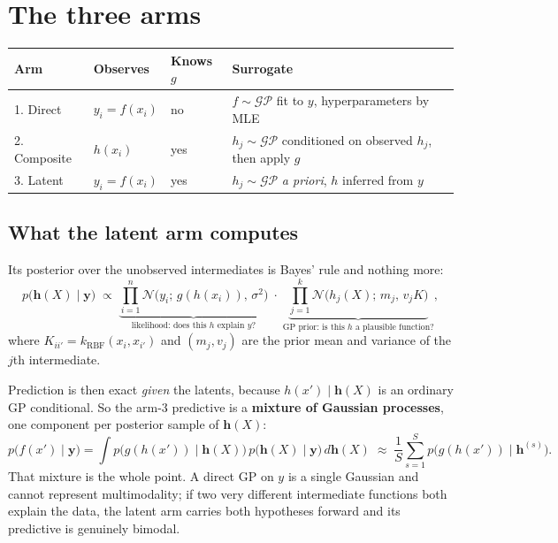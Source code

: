 \documentclass[11pt]{article}
\newcommand{\GP}{\mathcal{GP}}
\newcommand{\Norm}{\mathcal{N}}
\begin{document}
\section{The three arms}

\begin{center}
\begin{tabular}{llll}
\toprule
Arm & Observes & Knows $g$ & Surrogate \\
\midrule
1. Direct    & $y_i=f(x_i)$ & no  & $f\sim\GP$ fit to $y$, hyperparameters by MLE \\
2. Composite & $h(x_i)$     & yes & $h_j\sim\GP$ conditioned on observed $h_j$, then apply $g$ \\
3. Latent    & $y_i=f(x_i)$ & yes & $h_j\sim\GP$ \emph{a priori}, $h$ inferred from $y$ \\
\bottomrule
\end{tabular}
\end{center}

\subsection{What the latent arm computes}

Its posterior over the unobserved intermediates is Bayes' rule and nothing more:
\begin{equation}
p\bigl(\mathbf{h}(X)\mid \mathbf{y}\bigr)\;\propto\;
\underbrace{\prod_{i=1}^{n}\Norm\!\bigl(y_i;\,g(h(x_i)),\,\sigma^2\bigr)}_{\text{likelihood: does this }h\text{ explain }y?}
\;\cdot\;
\underbrace{\prod_{j=1}^{k}\Norm\!\bigl(h_j(X);\,m_j,\,v_jK\bigr)}_{\text{GP prior: is this }h\text{ a plausible function?}} ,
\label{eq:posterior}
\end{equation}
where $K_{ii'}=k_{\mathrm{RBF}}(x_i,x_{i'})$ and $(m_j,v_j)$ are the prior mean
and variance of the $j$th intermediate.

Prediction is then exact \emph{given} the latents, because
$h(x')\mid\mathbf{h}(X)$ is an ordinary GP conditional. So the arm-3 predictive
is a \textbf{mixture of Gaussian processes}, one component per posterior sample
of $\mathbf{h}(X)$:
\begin{equation}
p\bigl(f(x')\mid\mathbf{y}\bigr)=\int p\bigl(g(h(x'))\mid \mathbf{h}(X)\bigr)\,
p\bigl(\mathbf{h}(X)\mid\mathbf{y}\bigr)\,d\mathbf{h}(X)
\;\approx\;\frac{1}{S}\sum_{s=1}^{S}p\bigl(g(h(x'))\mid\mathbf{h}^{(s)}\bigr).
\end{equation}
That mixture is the whole point. A direct GP on $y$ is a single Gaussian and
cannot represent multimodality; if two very different intermediate functions
both explain the data, the latent arm carries both hypotheses forward and its
predictive is genuinely bimodal.
\end{document}

